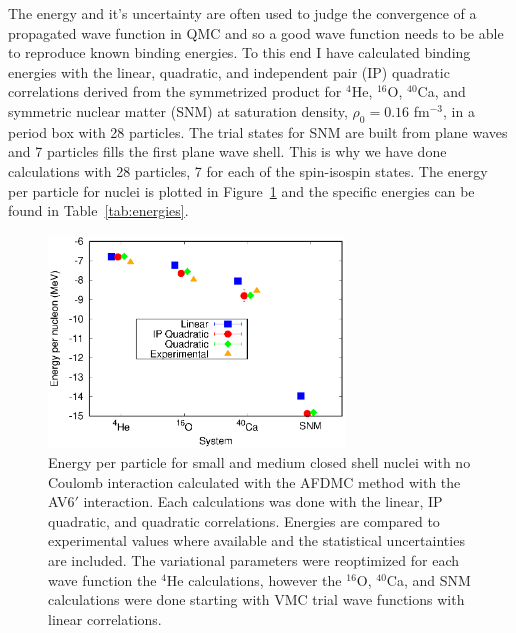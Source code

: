 The energy and it's uncertainty are often used to judge the convergence of a propagated wave function in QMC and so a good wave function needs to be able to reproduce known binding energies. To this end I have calculated binding energies with the linear, quadratic, and independent pair (IP) quadratic correlations derived from the symmetrized product for $^4$He, $^{16}$O, $^{40}$Ca, and symmetric nuclear matter (SNM) at saturation density, $\rho_0=0.16$ fm$^{-3}$, in a period box with 28 particles. The trial states for SNM are built from plane waves and 7 particles fills the first plane wave shell. This is why we have done calculations with 28 particles, 7 for each of the spin-isospin states. The energy per particle for nuclei is plotted in Figure~\ref{fig:energies} and the specific energies can be found in Table~\ref{tab:energies}.
\begin{figure}[h!]
   \centering
   \includegraphics[width=0.7\textwidth]{figures/energy.eps}
   \caption{Energy per particle for small and medium closed shell nuclei with no Coulomb interaction calculated with the AFDMC method with the AV6$'$ interaction. Each calculations was done with the linear, IP quadratic, and quadratic correlations. Energies are compared to experimental values where available and the statistical uncertainties are included. The variational parameters were reoptimized for each wave function the $^4$He calculations, however the $^{16}$O, $^{40}$Ca, and SNM calculations were done starting with VMC trial wave functions with linear correlations.}
   \label{fig:energies}
\end{figure}
